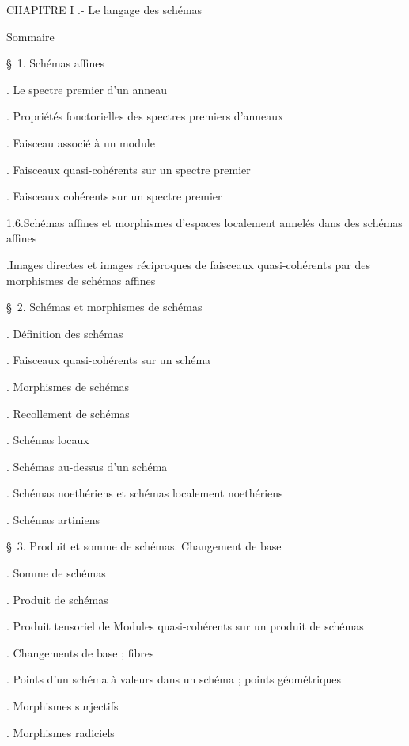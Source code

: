 \noindent CHAPITRE I .- Le langage des schémas\dotfill

\noindent\quad Sommaire\dotfill

\noindent\quad \S\ 1. Schémas affines\dotfill

\noindent{}. Le spectre premier d'un anneau\dotfill

\noindent{}. Propriétés fonctorielles des spectres premiers d'anneaux\dotfill

\noindent{}. Faisceau associé à un module\dotfill

\noindent{}. Faisceaux quasi-cohérents sur un spectre premier\dotfill

\noindent{}. Faisceaux cohérents sur un spectre premier\dotfill

\noindent\qquad {}1.6.Schémas affines et morphismes d'espaces localement annelés dans des schémas affines\dotfill

\noindent{}.Images directes et images réciproques de faisceaux quasi-cohérents par des morphismes de schémas affines\dotfill

\noindent\quad \S\ 2. Schémas et morphismes de schémas\dotfill

\noindent{}. Définition des schémas\dotfill

\noindent{}. Faisceaux quasi-cohérents sur un schéma\dotfill

\noindent{}. Morphismes de schémas\dotfill

\noindent{}. Recollement de schémas\dotfill

\noindent{}. Schémas locaux\dotfill

\noindent{}. Schémas au-dessus d'un schéma\dotfill

\noindent{}. Schémas noethériens et schémas localement noethériens\dotfill

\noindent{}. Schémas artiniens\dotfill

\noindent\quad \S\ 3. Produit et somme de schémas. Changement de base\dotfill

\noindent{}. Somme de schémas\dotfill

\noindent{}. Produit de schémas\dotfill

\noindent{}. Produit tensoriel de Modules quasi-cohérents sur un produit de schémas\dotfill

\noindent{}. Changements de base ; fibres\dotfill

\noindent{}. Points d'un schéma à valeurs dans un schéma ; points géométriques\dotfill

\noindent{}. Morphismes surjectifs\dotfill

\noindent{}. Morphismes radiciels\dotfill

